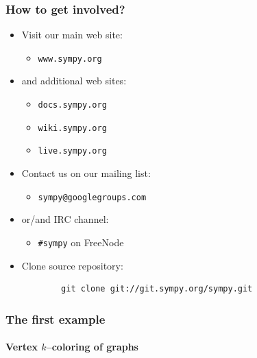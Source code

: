 \documentclass{beamer}
\begin{document}
\begin{frame}[fragile]
    \frametitle{How to get involved?}

    \begin{itemize}
        \item Visit our main web site:
            \begin{itemize}
                \item \texttt{www.sympy.org}
            \end{itemize}
        \item and additional web sites:
            \begin{itemize}
                \item \texttt{docs.sympy.org}
                \item \texttt{wiki.sympy.org}
                \item \texttt{live.sympy.org}
            \end{itemize}
        \item Contact us on our mailing list:
            \begin{itemize}
                \item \texttt{sympy@googlegroups.com}
            \end{itemize}
        \item or/and IRC channel:
            \begin{itemize}
                \item \texttt{\#sympy} on FreeNode
            \end{itemize}
        \item Clone source repository:
        \begin{verbatim}
        git clone git://git.sympy.org/sympy.git
        \end{verbatim}
    \end{itemize}
\end{frame}

\begin{frame}
    \frametitle{The first example}
    \framesubtitle{Vertex $k$--coloring of graphs}

    \begin{columns}
        \begin{column}[l]{0.4\textwidth}
            \begin{center}
                
            \end{center}
        \end{column}
        \begin{column}[r]{0.4\textwidth}
            \pause
            \begin{center}
                
            \end{center}
        \end{column}
    \end{columns}
\end{frame}
\end{document}
